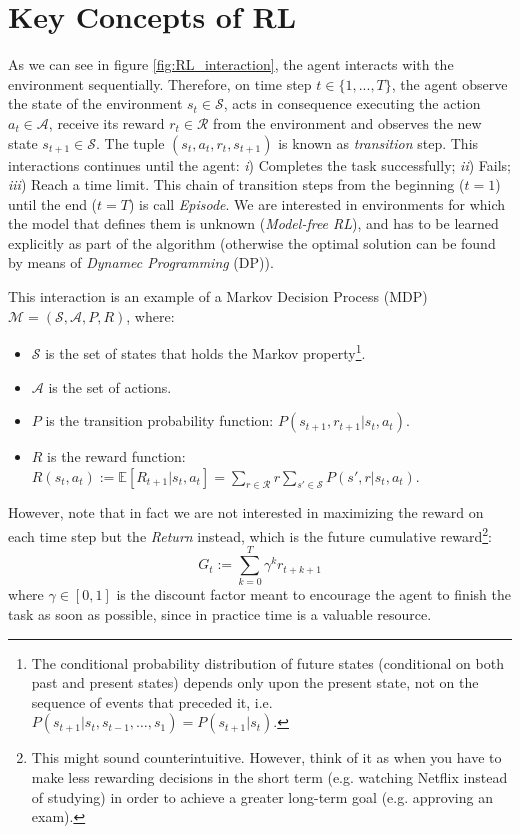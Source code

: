 \documentclass[twoside,twocolumn]{article}
\begin{document}

\section{Key Concepts of RL}

As we can see in figure \ref{fig:RL_interaction}, the agent interacts with the environment sequentially. Therefore, on time step $t \in \{1,...,T\}$, the agent observe the state of the environment $s_t \in \mathcal{S}$, acts in consequence executing the action $a_t \in \mathcal{A}$, receive its reward $r_t \in \mathcal{R}$ from the environment and observes the new state $s_{t+1} \in \mathcal{S}$.
The tuple $(s_t, a_t, r_t, s_{t+1})$ is known as \emph{transition} step.
This interactions continues until the agent: \textit{i}) Completes the task successfully; \textit{ii}) Fails; \textit{iii}) Reach a time limit. This chain of transition steps from the beginning ($t=1$) until the end ($t=T$) is call \emph{Episode}.
We are interested in environments for which the model that defines them is unknown (\emph{Model-free RL}), and has to be learned explicitly as part of the algorithm (otherwise the optimal solution can be found by means of \emph{Dynamec Programming} (DP)).

\noindent This interaction  is an example of a Markov Decision Process (MDP)\cite{Sutton1998} $\mathcal{M}=(\mathcal{S}, \mathcal{A}, P, R)$, where:

\begin{itemize}
    \item $\mathcal{S}$ is the set of states that holds the Markov property\footnote{The conditional probability distribution of future states (conditional on both past and present states) depends only upon the present state, not on the sequence of events that preceded it, i.e. $P(s_{t+1}|s_{t}, s_{t-1},\dots, s_1)=P(s_{t+1}|s_{t})$.}.
    \item $\mathcal{A}$ is the set of actions.
    \item $P$ is the transition probability function: $P(s_{t+1},r_{t+1}|s_t, a_t)$.
    \item $R$ is the reward function: $R(s_t, a_t):=\mathbb{E}[R_{t+1}|s_t,a_t]=\sum_{r\in \mathcal{R}}r \sum_{s' \in \mathcal{S}}P(s',r|s_t, a_t)$.
\end{itemize}

However, note that in fact we are not interested in maximizing the reward on each time step but the \emph{Return} instead, which is the future cumulative reward\footnote{This might sound counterintuitive. However, think of it as when you have to make less rewarding decisions in the short term (e.g. watching Netflix instead of studying) in order to achieve a greater long-term goal (e.g. approving an exam).}:
\begin{equation}
  G_t := \sum_{k=0}^T \gamma^k r_{t+k+1}
\end{equation}
where $\gamma \in [0,1]$ is the discount factor meant to encourage the agent to finish the task as soon as possible, since in practice time is a valuable resource.
\end{document}
